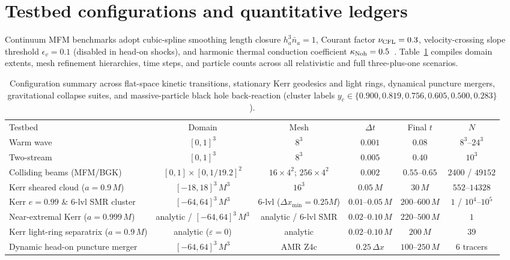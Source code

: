 \section{Testbed configurations and quantitative ledgers}\label{app:params}

Continuum MFM benchmarks adopt cubic-spline smoothing length closure $h_a^3 \bar{n}_a = 1$, Courant factor $\nu_{\rm CFL} = 0.3$, velocity-crossing slope threshold $\epsilon_v = 0.1$ (disabled in head-on shocks), and harmonic thermal conduction coefficient $\kappa_{\rm Noh} = 0.5$~\cite{Noh:1987}. Table~\ref{tab:configs} compiles domain extents, mesh refinement hierarchies, time steps, and particle counts across all relativistic and full three-plus-one scenarios.

\begin{table}[tbp]
\caption{\label{tab:configs}%
Configuration summary across flat-space kinetic transitions, stationary Kerr geodesics and light rings, dynamical puncture mergers, gravitational collapse suites, and massive-particle black hole back-reaction (cluster labels $y_c \in \{0.900, 0.819, 0.756, 0.605, 0.500, 0.283\}$).}
\scriptsize
\setlength{\tabcolsep}{2.5pt}
\begin{ruledtabular}
\begin{tabular}{lccccc}
Testbed & Domain & Mesh & $\Delta t$ & Final $t$ & $N$ \\
\colrule
Warm wave & $[0,1]^3$ & $8^3$ & $0.001$ & $0.08$ & $8^3\text{--}24^3$ \\
Two-stream & $[0,1]^3$ & $8^3$ & $0.005$ & $0.40$ & $10^3$ \\
Colliding beams (MFM/BGK) & $[0,1]\times[0,1/19.2]^2$ & $16\times 4^2$; $256\times 4^2$ & $0.002$ & $0.55\text{--}0.65$ & $2400$ / $49152$ \\
Kerr sheared cloud ($a=0.9\,M$) & $[-18,18]^3\,M^3$ & $16^3$ & $0.05\,M$ & $30\,M$ & $552\text{--}14328$ \\
Kerr $e=0.99$ \& $6$-lvl SMR cluster & $[-64,64]^3\,M^3$ & $6$-lvl ($\Delta x_{\min}=0.25M$) & $0.01\text{--}0.05\,M$ & $200\text{--}600\,M$ & $1$ / $10^4\text{--}10^5$ \\
Near-extremal Kerr ($a=0.999\,M$) & analytic / $[-64,64]^3\,M^3$ & analytic / $6$-lvl SMR & $0.02\text{--}0.10\,M$ & $220\text{--}500\,M$ & $1$ \\
Kerr light-ring separatrix ($a=0.9\,M$) & analytic ($\varepsilon = 0$) & analytic & $0.02\text{--}0.10\,M$ & $200\,M$ & $39$ \\
Dynamic head-on puncture merger & $[-64,64]^3\,M^3$ & AMR Z4c & $0.25\,\Delta x$ & $100\text{--}250\,M$ & $6$ tracers \\

\end{tabular}
\end{ruledtabular}
\end{table}
